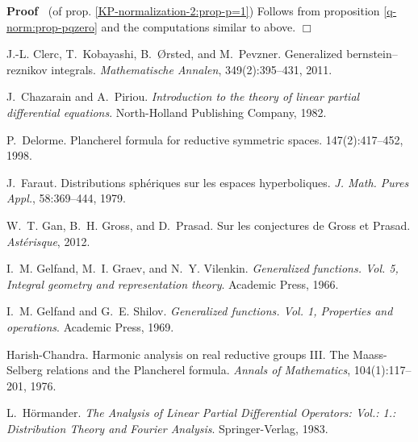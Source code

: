 \documentclass{article}
\newcommand{\tmtextit}[1]{{\itshape{#1}}}
\newenvironment{proof}{\noindent\textbf{Proof\ }}{\hspace*{\fill}$\Box$\medskip}
\numberwithin{definition}{section}
\numberwithin{lemma}{section}
\numberwithin{proposition}{section}
{\theorembodyfont{\rmfamily}\newtheorem{remark}{Remark}
\numberwithin{remark}{section}
}
\begin{document}
\begin{proof}
  (of prop. \ref{KP-normalization-2:prop-p=1}) Follows from proposition
  \ref{q-norm:prop-pqzero} and the computations similar to above.
\end{proof}

\begin{thebibliography}{CK{\O}P11}
  J.-L. Clerc, T.~Kobayashi,
  B.~{\O}rsted, and M.~Pevzner. {\newblock}Generalized bernstein--reznikov
  integrals. {\newblock}\tmtextit{Mathematische Annalen}, 349(2):395--431,
  2011.
  
  J.~Chazarain and A.~Piriou.
  {\newblock}\tmtextit{Introduction to the theory of linear partial
  differential equations}. {\newblock}North-Holland Publishing Company, 1982.
  
  P.~Delorme. {\newblock}Plancherel
  formula for reductive symmetric spaces. {\newblock}147(2):417--452, 1998.
  
  J.~Faraut. {\newblock}Distributions
  sph{\'e}riques sur les espaces hyperboliques. {\newblock}\tmtextit{J. Math.
  Pures Appl.}, 58:369--444, 1979.
  
  W.~T. Gan, B.~H. Gross, and D.~Prasad.
  {\newblock}Sur les conjectures de Gross et Prasad.
  {\newblock}\tmtextit{Ast{\'e}risque}, 2012.
  
  I.~M. Gelfand, M.~I. Graev, and N.~Y.
  Vilenkin. {\newblock}\tmtextit{Generalized functions. Vol. 5, Integral
  geometry and representation theory}. {\newblock}Academic Press, 1966.
  
  I.~M. Gelfand and G.~E. Shilov.
  {\newblock}\tmtextit{Generalized functions. Vol. 1, Properties and
  operations}. {\newblock}Academic Press, 1969.
  
  Harish-Chandra. {\newblock}Harmonic
  analysis on real reductive groups III. The Maass-Selberg relations and the
  Plancherel formula. {\newblock}\tmtextit{Annals of Mathematics},
  104(1):117--201, 1976.
  
  L.~H{\"o}rmander.
  {\newblock}\tmtextit{The Analysis of Linear Partial Differential Operators:
  Vol.: 1.: Distribution Theory and Fourier Analysis}.
  {\newblock}Springer-Verlag, 1983.
  

\end{thebibliography}
\end{document}
